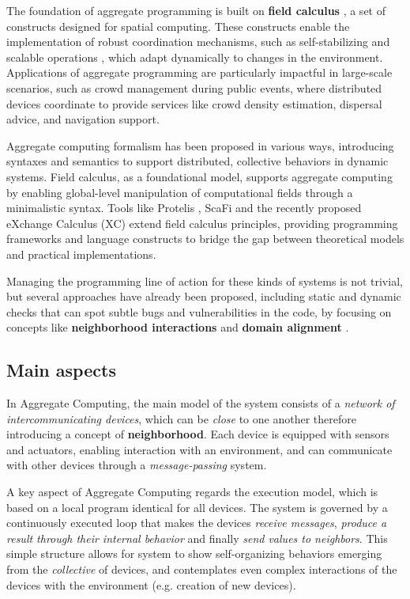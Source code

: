 \documentclass[12pt,a4paper,openright,twoside]{book}
\begin{document}
The foundation of aggregate programming is built on \textbf{field calculus}
\cite{Beal2014TowardsAU}, a set of constructs designed for spatial computing.
These constructs enable the implementation of robust coordination mechanisms,
such as self-stabilizing and scalable operations \cite{Viroli2018}
\cite{DBLP:journals/jlap/ViroliBDACP19}, which adapt dynamically to changes in
the environment. Applications of aggregate programming are particularly
impactful in large-scale scenarios, such as crowd management during public
events, where distributed devices coordinate to provide services like crowd
density estimation, dispersal advice, and navigation support.

Aggregate computing formalism has been proposed in various ways, introducing
syntaxes and semantics to support distributed, collective behaviors in dynamic
systems. Field calculus, as a foundational model, supports aggregate computing
by enabling global-level manipulation of computational fields through a
minimalistic syntax. 
%
Tools like Protelis \cite{DBLP:conf/saso/PianiniBV17}, ScaFi
\cite{DBLP:conf/ecoop/CasadeiV16} and the recently proposed eXchange Calculus
(XC) \cite{DBLP:journals/jss/AudritoCDSV24} extend field calculus principles,
providing programming frameworks and language constructs to bridge the gap
between theoretical models and practical implementations.

Managing the programming line of action for these kinds of systems is not
trivial, but several approaches have already been proposed, including static and
dynamic checks that can spot subtle bugs and vulnerabilities in the code, by
focusing on concepts like \textbf{neighborhood interactions} and \textbf{domain
alignment} \cite{DBLP:conf/saso/AudritoDVC16}.

\subsection{Main aspects}

In Aggregate Computing, the main model of the system consists of a \emph{network of 
intercommunicating devices}, which can be \emph{close} to one another therefore 
introducing a concept of \textbf{neighborhood}. 
%
Each device is equipped with sensors and actuators, enabling interaction with an
environment, and can communicate with other devices through a
\emph{message-passing} system. 

A key aspect of Aggregate Computing regards the execution model, which is based
on a local program identical for all devices. The system is governed by a
continuously executed loop that makes the devices \emph{receive messages},
\emph{produce a result through their internal behavior} and finally \emph{send
values to neighbors}. 
%
This simple structure allows for system to show self-organizing behaviors
emerging from the \emph{collective} of devices, and contemplates even complex
interactions of the devices with the environment (e.g. creation of new devices).
\end{document}
